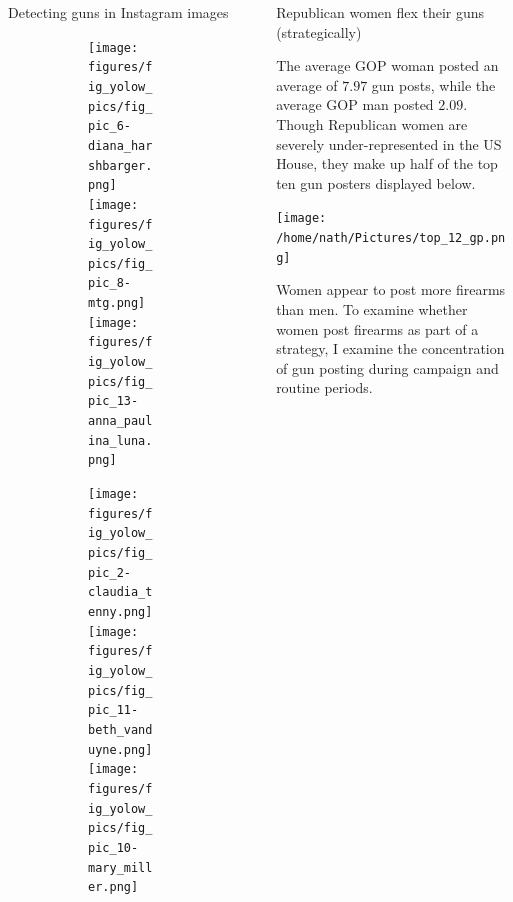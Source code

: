 \documentclass[final]{beamer}
\newlength{\sepwidth}
\newlength{\colwidth}
\newcommand{\separatorcolumn}{\begin{column}{\sepwidth}\end{column}}
\begin{document}
\begin{frame}[t]
\begin{columns}[t]
\begin{column}{\colwidth}
\begin{block}{Detecting guns in Instagram images}
\begin{figure}[!htb]
\begin{subfigure}{\linewidth}
\begin{center}
    \texttt{[image: figures/fig\_yolow\_pics/fig\_pic\_6-diana\_harshbarger.png]} 
    \texttt{[image: figures/fig\_yolow\_pics/fig\_pic\_8-mtg.png]}
    \texttt{[image: figures/fig\_yolow\_pics/fig\_pic\_13-anna\_paulina\_luna.png]}
    \end{center}
    \begin{center}
    \texttt{[image: figures/fig\_yolow\_pics/fig\_pic\_2-claudia\_tenny.png]}
    \texttt{[image: figures/fig\_yolow\_pics/fig\_pic\_11-beth\_vanduyne.png]}
    \texttt{[image: figures/fig\_yolow\_pics/fig\_pic\_10-mary\_miller.png]}
    \end{center}
    \end{subfigure}
\end{figure}



\end{block}

\end{column}

\separatorcolumn

\begin{column}{\colwidth}

\begin{block}{Republican women flex their guns (strategically)}

The average GOP woman posted an average of $7.97$ gun posts, while the average GOP man posted $2.09$. Though Republican women are severely under-represented in the US House, they make up half of the top ten gun posters displayed below.
\begin{center}
\texttt{[image: /home/nath/Pictures/top\_12\_gp.png]}
\end{center}
Women appear to post more firearms than men. To examine whether women post firearms as part of a strategy, I examine the concentration of gun posting during campaign and routine periods. 


\end{block}
\end{column}
\end{columns}
\end{frame}
\end{document}
